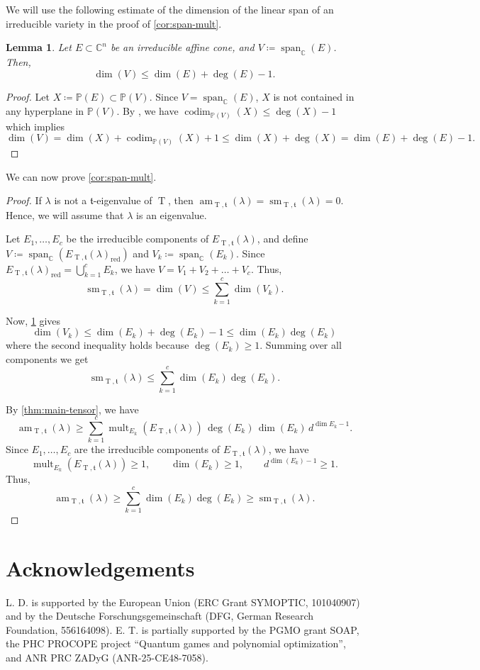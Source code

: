 \documentclass[11pt,letterpaper]{article}
\newtheorem{lemma}[theorem]{Lemma}\AddToHook{env/lemma/begin}{\crefalias{theorem}{lemma}}
\numberwithin{equation}{section}
\newcommand{\PP}{\mathbb{P}}
\newcommand{\CC}{\mathbb{C}}
\newcommand{\ft}{\mathfrak{t}}
\DeclareMathOperator{\codim}{codim}
\DeclareMathOperator{\am}{am}
\DeclareMathOperator{\sm}{sm}
\DeclareMathOperator{\T}{T}
\DeclareMathOperator{\mult}{mult}
\DeclareMathOperator{\red}{red}
\begin{document}
We will use the following estimate of the dimension of the linear span of an irreducible variety in the proof of \cref{cor:span-mult}.

\begin{lemma}
\label{lem:deg-dim-ineq}
Let $E\subset\CC^n$ be an irreducible affine cone, and $V\coloneqq \operatorname{span}_{\CC}(E)$.
    Then, \[
    \dim(V)\leq \dim(E) + \deg(E) - 1.
    \]
\end{lemma}
\begin{proof}
Let $X\coloneqq \PP(E)\subset\PP(V)$.
 Since $V=\operatorname{span}_{\CC}(E)$, $X$ is not contained in any hyperplane in $\PP(V)$.
    By \cite[Proposition~0]{Eisenbud-Harris-87}, we have $\codim_{\PP(V)}(X)\leq \deg(X)-1$ which implies \[
   \dim(V) = \dim(X) + \codim_{\PP(V)}(X) + 1 \leq \dim(X) + \deg(X) = \dim(E) + \deg(E) -1.
    \]
\end{proof}

We can now prove \cref{cor:span-mult}.

\spanmult*
\begin{proof}
    If $\lambda$ is not a $\ft$-eigenvalue of $\T$, then $\am_{\T,\ft}(\lambda)=\sm_{\T,\ft}(\lambda)=0$.
    Hence, we will assume that $\lambda$ is an eigenvalue.
    
    Let $E_1,\dots,E_c$ be the irreducible components of $E_{\T,\ft}(\lambda)$, and define $V\coloneqq \operatorname{span}_{\CC}(E_{\T,\ft}(\lambda)_{\red})$ and $V_k\coloneqq\operatorname{span}_{\CC}(E_k)$.
    Since $E_{\T,\ft}(\lambda)_{\red}=\bigcup_{k=1}^c E_k$, we have $V = V_1 + V_2 + \dots + V_c$.
    Thus, \[
    \sm_{\T,\ft}(\lambda) = \dim(V) \leq \sum_{k=1}^c \dim(V_k).
    \]

    Now, \cref{lem:deg-dim-ineq} gives \[
    \dim(V_k)\leq \dim(E_k) + \deg(E_k)-1\leq \dim(E_k)\deg(E_k)
    \] where the second inequality holds because $\deg(E_k)\geq 1$.
    Summing over all components we get 
\[
    \sm_{\T,\ft}(\lambda) \leq \sum_{k=1}^c \dim(E_k)\deg(E_k).
\]

    By \cref{thm:main-tensor}, we have \[
    \am_{\T,\ft}(\lambda) \geq \sum_{k=1}^c \mult_{E_k}(E_{\T,\ft}(\lambda))\,\deg(E_k)\, \dim(E_k)\,  d^{\dim E_k-1}.
    \]
    Since $E_1,\dots,E_c$ are the irreducible components of $E_{\T,\ft}(\lambda)$, we have \[
    \mult_{E_{k}}(E_{\T,\ft}(\lambda))\geq 1, \qquad \dim(E_k)\geq 1, \qquad d^{\dim (E_k) -1}\geq 1.
    \]
    Thus, \[
    \am_{\T,\ft}(\lambda) \geq \sum_{k=1}^c \dim(E_k)\deg(E_k) \geq \sm_{\T,\ft}(\lambda).
    \] 
\end{proof}

\section*{Acknowledgements}

L. D. is supported by the European Union (ERC Grant SYMOPTIC, 101040907) and by the Deutsche Forschungsgemeinschaft (DFG, German Research Foundation, 556164098).
E. T. is  partially supported by the PGMO grant SOAP, 
the PHC PROCOPE project ``Quantum  games and polynomial optimization'',
and ANR PRC ZADyG (ANR-25-CE48-7058). 



\end{document}
